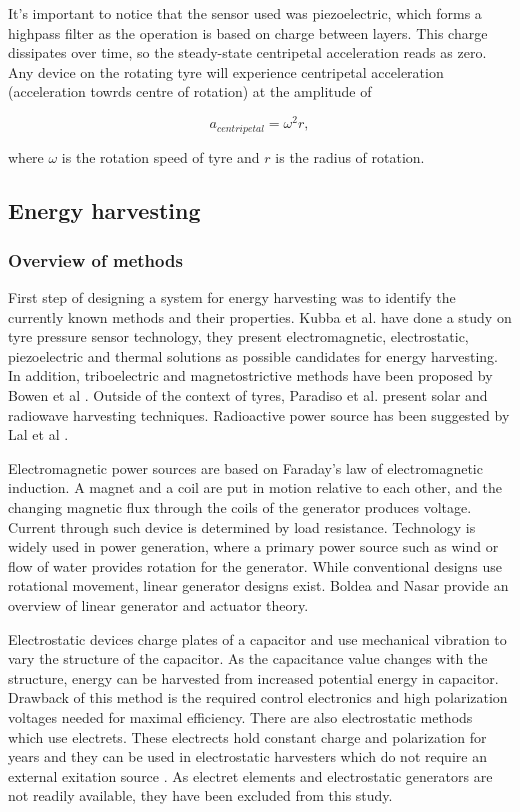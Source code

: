 It's important to notice that the sensor used was piezoelectric, which forms a highpass filter as the operation is based on charge between layers. This charge dissipates over time, so the steady-state centripetal acceleration reads as zero. Any device on the rotating tyre will experience centripetal acceleration (acceleration towrds centre of rotation) at the amplitude of 

\begin{equation}
  a_{centripetal} = \omega^2 r,
\end{equation}

where $\omega$ is the rotation speed of tyre and $r$ is the radius of rotation.

\subsection{Energy harvesting}
\subsubsection{Overview of methods}
First step of designing a system for energy harvesting was to identify the currently known methods and their properties. Kubba et al. \cite{Kubba2014} have done a study on tyre pressure sensor technology, they present electromagnetic, electrostatic, piezoelectric and thermal solutions as possible candidates for energy harvesting. In addition, triboelectric and magnetostrictive methods have been proposed by Bowen et al \cite{Bowen2014}. Outside of the context of tyres, Paradiso et al. \cite{Paradiso2005} present solar and radiowave harvesting techniques. Radioactive power source has been suggested by Lal et al \cite{Lal2004}. 

Electromagnetic power sources are based on Faraday's law of electromagnetic induction. A magnet and a coil are put in motion relative to each other, and the changing magnetic flux through the coils of the generator produces voltage. Current through such device is determined by load resistance. Technology is widely used in power generation, where a primary power source such as wind or flow of water provides rotation for the generator. While conventional designs use rotational movement, linear generator designs exist. Boldea and Nasar \cite{Boldea1999} provide an overview of linear generator and actuator theory. 

Electrostatic devices charge plates of a capacitor and use mechanical vibration to vary the structure of the capacitor. As the capacitance value changes with the structure, energy can be harvested from increased potential energy in capacitor. Drawback of this method is the required control electronics and high polarization voltages needed for maximal efficiency. There are also electrostatic methods which use electrets. These electrects hold constant charge and polarization for years and they can be used in electrostatic harvesters which do not require an external exitation source \cite{Boisseau2012}. As electret elements and electrostatic generators are not readily available, they have been excluded from this study.

